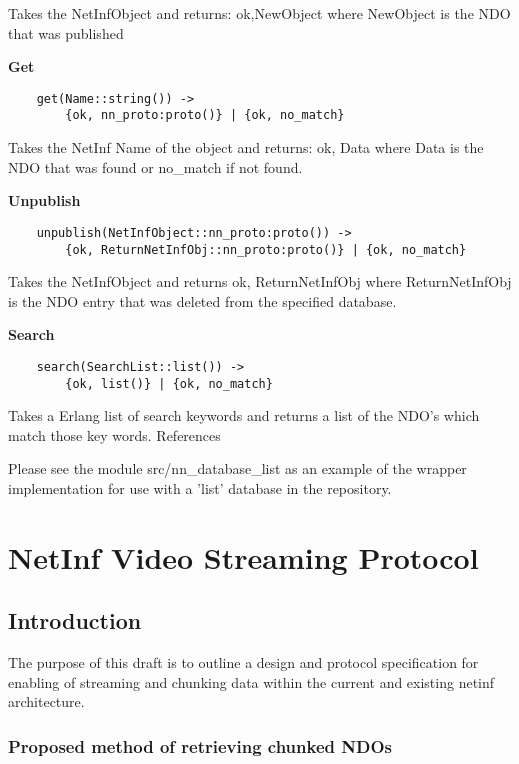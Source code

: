 \documentclass[11pt]{report}
\begin{document}
Takes the NetInfObject and returns: {ok,NewObject} where NewObject is the NDO that was published

\textbf{Get}

\begin {verbatim}
    get(Name::string()) -> 
    	{ok, nn_proto:proto()} | {ok, no_match}
\end{verbatim}

Takes the NetInf Name of the object and returns: {ok, Data} where Data is the NDO that was found or no\_match if not found.

\textbf{Unpublish}

\begin {verbatim}
    unpublish(NetInfObject::nn_proto:proto()) -> 
    	{ok, ReturnNetInfObj::nn_proto:proto()} | {ok, no_match}
\end{verbatim}

Takes the NetInfObject and returns {ok, ReturnNetInfObj} where ReturnNetInfObj is the NDO entry that was deleted from the specified database.

\textbf{Search}

\begin {verbatim}
    search(SearchList::list()) -> 
    	{ok, list()} | {ok, no_match}
\end{verbatim}

Takes a Erlang list of search keywords and returns a list of the NDO's which match those key words.
References

Please see the module src/nn\_database\_list as an example of the wrapper implementation for use with a 'list' database in the repository.



\section {NetInf Video Streaming Protocol}

\subsection{Introduction}

The purpose of this draft is to outline a design and protocol specification for enabling of streaming and chunking data within the current and existing netinf architecture.

\subsubsection{Proposed method of retrieving chunked NDOs}
\end{document}
